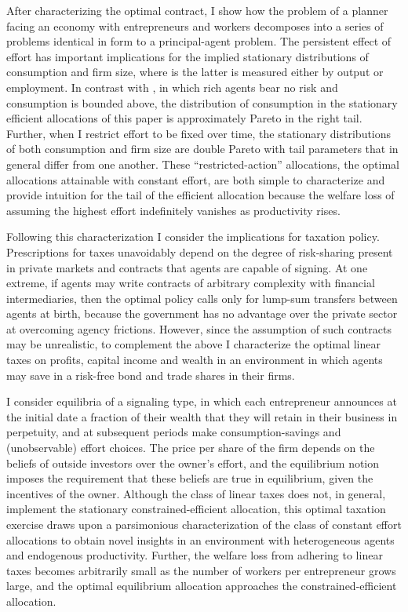 \documentclass[11pt]{article}
\theoremstyle{plain}
\begin{document}
After characterizing the optimal contract, I show how the problem of a planner facing an economy with entrepreneurs and workers decomposes into a series of problems identical in form to a principal-agent problem. The persistent effect of effort has important implications for the implied stationary distributions of consumption and firm size, where is the latter is measured either by output or employment. In contrast with \cite{sannikov_continuous-time_2008}, in which rich agents bear no risk and consumption is bounded above, the distribution of consumption in the stationary efficient allocations of this paper is approximately Pareto in the right tail. Further, when I restrict effort to be fixed over time, the stationary distributions of both consumption and firm size are double Pareto with tail parameters that in general differ from one another. These ``restricted-action'' allocations, the optimal allocations attainable with constant effort, are both simple to characterize and provide intuition for the tail of the efficient allocation because the welfare loss of assuming the highest effort indefinitely vanishes as productivity rises. 


Following this characterization I consider the implications for taxation policy. Prescriptions for taxes unavoidably depend on the degree of risk-sharing present in private markets and contracts that agents are capable of signing. At one extreme, if agents may write contracts of arbitrary complexity with financial intermediaries, then the optimal policy calls only for lump-sum transfers between agents at birth, because the government has no advantage over the private sector at overcoming agency frictions. However, since the assumption of such contracts may be unrealistic, to complement the above I characterize the optimal linear taxes on profits, capital income and wealth in an environment in which agents may save in a risk-free bond and trade shares in their firms. 

I consider equilibria of a signaling type, in which each entrepreneur announces at the initial date a fraction of their wealth that they will retain in their business in perpetuity, and at subsequent periods make consumption-savings and (unobservable) effort choices. The price per share of the firm depends on the beliefs of outside investors over the owner's effort, and the equilibrium notion imposes the requirement that these beliefs are true in equilibrium, given the incentives of the owner. Although the class of linear taxes does not, in general, implement the stationary constrained-efficient allocation, this optimal taxation exercise draws upon a parsimonious characterization of the class of constant effort allocations to obtain novel insights in an environment with heterogeneous agents and endogenous productivity. Further, the welfare loss from adhering to linear taxes becomes arbitrarily small as the number of workers per entrepreneur grows large, and the optimal equilibrium allocation approaches the constrained-efficient allocation. 
\end{document}

